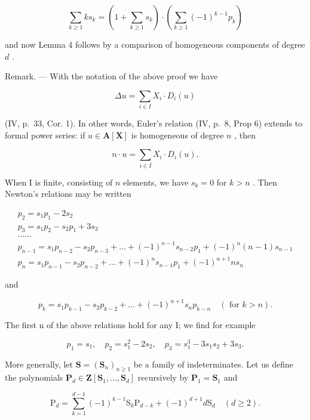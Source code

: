 \[
\sum_ {k \geqslant 1} k s _ {k} = \left(1 + \sum_ {k \geqslant 1} s _ {k}\right) \cdot \left(\sum_ {k \geqslant 1} (- 1) ^ {k - 1} p _ {k}\right)
\]

and now Lemma 4 follows by a comparison of homogeneous components of degree \(d\) .

Remark. --- With the notation of the above proof we have

\[
\Delta u = \sum_ {i \in I} X _ {i} \cdot D _ {i} (u)
\]

(IV, p.~33, Cor. 1). In other words, Euler's relation (IV, p.~8, Prop 6) extends to formal power series: if \(u \in \mathbf{A}[\mathbf{X}]\) is homogeneous of degree \(n\) , then

\[
n \cdot u = \sum_ {i \in I} X _ {i} \cdot D _ {i} (u).\tag{21}
\]

When I is finite, consisting of \(n\) elements, we have \(s_k = 0\) for \(k > n\) . Then Newton's relations may be written

\[
\begin{array}{l} p _ {2} = s _ {1} p _ {1} - 2 s _ {2} \\ p _ {3} = s _ {1} p _ {2} - s _ {2} p _ {1} + 3 s _ {3} \\ \dots \dots \\ p _ {n - 1} = s _ {1} p _ {n - 2} - s _ {2} p _ {n - 3} + \dots + (- 1) ^ {n - 1} s _ {n - 2} p _ {1} + (- 1) ^ {n} (n - 1) s _ {n - 1} \\ p _ {n} = s _ {1} p _ {n - 1} - s _ {2} p _ {n - 2} + \dots + (- 1) ^ {n} s _ {n - 1} p _ {1} + (- 1) ^ {n + 1} n s _ {n} \end{array}
\]

and

\[
p _ {k} = s _ {1} p _ {k - 1} - s _ {2} p _ {k - 2} + \dots + (- 1) ^ {n + 1} s _ {n} p _ {k - n} \quad (\text { for } k > n).\tag{22}
\]

The first n of the above relations hold for any I; we find for example

\[
p _ {1} = s _ {1}, \quad p _ {2} = s _ {1} ^ {2} - 2 s _ {2}, \quad p _ {3} = s _ {1} ^ {3} - 3 s _ {1} s _ {2} + 3 s _ {3}.
\]

More generally, let \(\mathbf{S} = (\mathbf{S}_n)_{n\geqslant 1}\) be a family of indeterminates. Let us define the polynomials \(\mathbf{P}_d\in \mathbf{Z}[\mathbf{S}_1,\dots ,\mathbf{S}_d]\) recursively by \(\mathbf{P}_1 = \mathbf{S}_1\) and

\[
\mathrm{P} _ {d} = \sum_ {k = 1} ^ {d - 1} (- 1) ^ {k - 1} \mathrm{S} _ {k} \mathrm{P} _ {d - k} + (- 1) ^ {d + 1} d \mathrm{S} _ {d} \quad (d \geqslant 2).
\]

